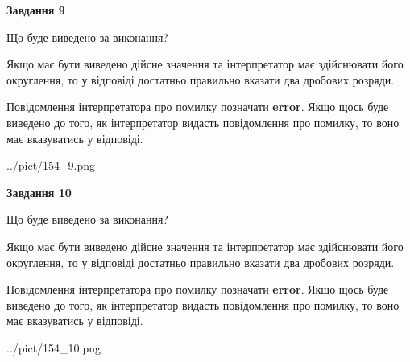 \documentclass[12pt, ukrainian]{article}
\begin{document}
{\begin {Large}
{\begin {center}\textbf{Завдання 9}\end {center}}\par
Що буде виведено за виконання? \par

Якщо має бути виведено дійсне значення та інтерпретатор має здійснювати його округлення, 
то у відповіді достатньо правильно вказати два дробових розряди.

Повідомлення інтерпретатора про помилку позначати \textbf{error}.
Якщо щось буде виведено до того, як інтерпретатор видасть повідомлення про помилку, 
то воно має вказуватись у відповіді. \par

\begin{center}
	{../pict/154_9.png}
\end{center}
\newpage

{\begin {center}\textbf{Завдання 10}\end {center}}\par
Що буде виведено за виконання? \par

Якщо має бути виведено дійсне значення та інтерпретатор має здійснювати його округлення, 
то у відповіді достатньо правильно вказати два дробових розряди.

Повідомлення інтерпретатора про помилку позначати \textbf{error}.
Якщо щось буде виведено до того, як інтерпретатор видасть повідомлення про помилку, 
то воно має вказуватись у відповіді. \par

\begin{center}
	{../pict/154_10.png}
\end{center}
\newpage

\end {Large}}
\end{document}
